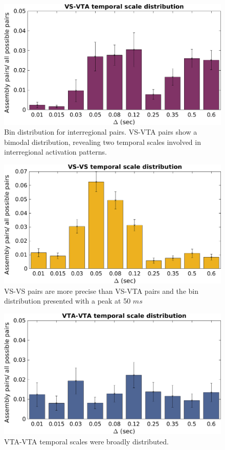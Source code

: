 \begin{figure}[H]
\centering
\includegraphics[scale=0.48]{figures/VS_VTA_Short1.png}
\caption{Bin distribution for interregional pairs. VS-VTA pairs show a bimodal distribution, revealing two temporal scales involved in interregional activation patterns.}
\label{fig:BinDistr}
\end{figure}
\begin{figure}[H]
\centering
\includegraphics[scale=0.48]{figures/VS_VS_S.png}
\caption{VS-VS pairs are more precise than VS-VTA pairs and the bin distribution presented with a peak at 50 $ms$}
\label{fig:BinDistrVS}
\end{figure}
\begin{figure}[H]
\centering
\includegraphics[scale=0.48]{figures/VTA_VTA_S.png}
\caption{VTA-VTA temporal scales were broadly distributed.}
\label{fig:BinDistrVTA}
\end{figure}
